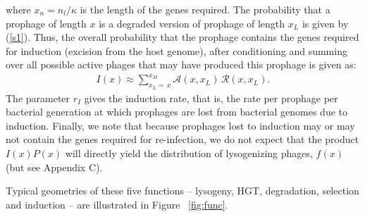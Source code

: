 where $x_n = n_l/\kappa$ is the length of the genes required.
The probability that a prophage of length $x$ is a degraded version of prophage of length $x_{L}$ is given by (\ref{s1}).
Thus, the overall probability that the prophage contains the genes required for induction (excision from the host genome), after conditioning and summing over all possible active phages that may have produced this prophage is given as:  
\begin{eqnarray}\label{ind}
I(x) \approx \sum \limits_{x_{L}=\,x}^{x_{M}}\mathcal{A}(x, x_{L})\,\mathcal{R}(x, x_{L}).
\end{eqnarray}
The parameter $r_I$ gives the induction rate, that is, the rate per prophage per bacterial generation at which prophages are lost from bacterial genomes due to induction.  Finally, we note that because prophages lost to induction may or may not contain the genes required for re-infection, we do not expect that the product $I(x) P(x)$ will directly yield the distribution of lysogenizing phages, $f(x)$ (but see Appendix C). 

Typical geometries of these five functions -- lysogeny, HGT, degradation, selection and induction -- are illustrated in Figure ~\ref{fig:func}.

